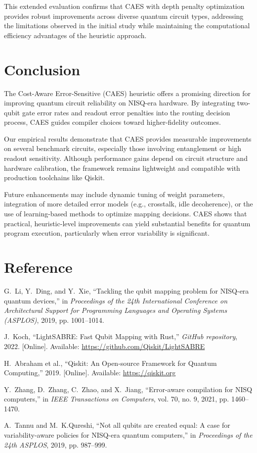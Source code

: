 \documentclass[conference]{IEEEtran}
\begin{document}
This extended evaluation confirms that CAES with depth penalty optimization provides robust improvements across diverse quantum circuit types, addressing the limitations observed in the initial study while maintaining the computational efficiency advantages of the heuristic approach.

\section{Conclusion}

The Cost-Aware Error-Sensitive (CAES) heuristic offers a promising direction for improving quantum circuit reliability on NISQ-era hardware. By integrating two-qubit gate error rates and readout error penalties into the routing decision process, CAES guides compiler choices toward higher-fidelity outcomes.

Our empirical results demonstrate that CAES provides measurable improvements on several benchmark circuits, especially those involving entanglement or high readout sensitivity. Although performance gains depend on circuit structure and hardware calibration, the framework remains lightweight and compatible with production toolchains like Qiskit.

Future enhancements may include dynamic tuning of weight parameters, integration of more detailed error models (e.g., crosstalk, idle decoherence), or the use of learning-based methods to optimize mapping decisions. CAES shows that practical, heuristic-level improvements can yield substantial benefits for quantum program execution, particularly when error variability is significant.
\section{Reference}
\begin{thebibliography}{00}

G.~Li, Y.~Ding, and Y.~Xie, “Tackling the qubit mapping problem for NISQ-era quantum devices,” in \emph{Proceedings of the 24th International Conference on Architectural Support for Programming Languages and Operating Systems (ASPLOS)}, 2019, pp. 1001–1014.

J.~Koch, “LightSABRE: Fast Qubit Mapping with Rust,” \emph{GitHub repository}, 2022. [Online]. Available: \url{https://github.com/Qiskit/LightSABRE}

H.~Abraham et al., “Qiskit: An Open-source Framework for Quantum Computing,” 2019. [Online]. Available: \url{https://qiskit.org}

Y.~Zhang, D.~Zhang, C.~Zhao, and X.~Jiang, “Error-aware compilation for NISQ computers,” in \emph{IEEE Transactions on Computers}, vol. 70, no. 9, 2021, pp. 1460–1470.

A.~Tannu and M.~K.Qureshi, “Not all qubits are created equal: A case for variability-aware policies for NISQ-era quantum computers,” in \emph{Proceedings of the 24th ASPLOS}, 2019, pp. 987–999.

\end{thebibliography}
\end{document}
